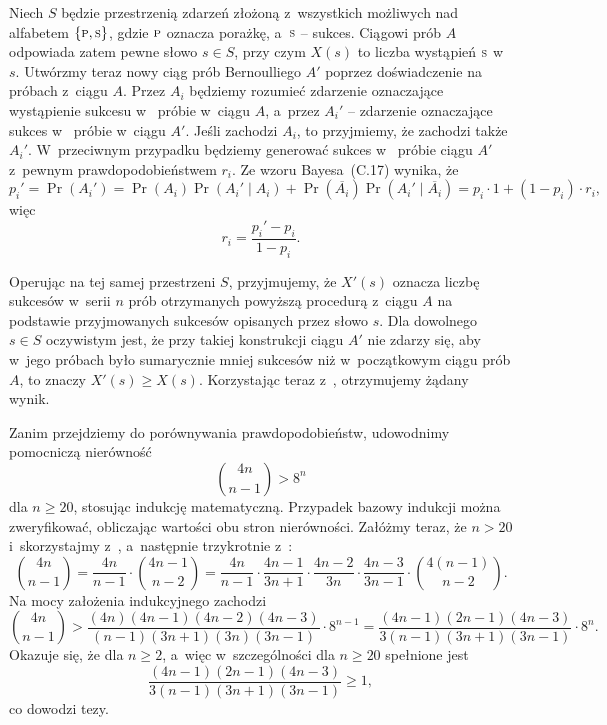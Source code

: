 \exercise %
Niech $S$ będzie przestrzenią zdarzeń złożoną z~wszystkich możliwych  nad alfabetem $\{{\scriptstyle\rm P},{\scriptstyle\rm S}\}$, gdzie ${\scriptstyle\rm P}$ oznacza porażkę, a~${\scriptstyle\rm S}$ -- sukces. Ciągowi prób $A$ odpowiada zatem pewne słowo $s\in S$, przy czym $X(s)$ to liczba wystąpień ${\scriptstyle\rm S}$ w~$s$. Utwórzmy teraz nowy ciąg prób Bernoulliego $A'$ poprzez doświadczenie na próbach z~ciągu $A$. Przez $A_i$ będziemy rozumieć zdarzenie oznaczające wystąpienie sukcesu w~ próbie w~ciągu $A$, a~przez $A_i'$ -- zdarzenie oznaczające sukces w~ próbie w~ciągu $A'$. Jeśli zachodzi $A_i$, to przyjmiemy, że zachodzi także $A_i'$. W~przeciwnym przypadku będziemy generować sukces w~ próbie ciągu $A'$ z~pewnym prawdopodobieństwem $r_i$. Ze wzoru Bayesa~(C.17) wynika, że
\[
    p_i' = \Pr(A_i') = \Pr(A_i)\Pr(A_i'\mid A_i)+\Pr(\overline{A_i})\Pr(A_i'\mid\overline{A_i}) = p_i\cdot1+(1-p_i)\cdot r_i,
\]
więc
\[
    r_i = \frac{p_i'-p_i}{1-p_i}.
\]

Operując na tej samej przestrzeni $S$, przyjmujemy, że $X'(s)$ oznacza liczbę sukcesów w~serii $n$ prób otrzymanych powyższą procedurą z~ciągu $A$ na podstawie przyjmowanych sukcesów opisanych przez słowo $s$. Dla dowolnego $s\in S$ oczywistym jest, że przy takiej konstrukcji ciągu $A'$ nie zdarzy się, aby w~jego próbach było sumarycznie mniej sukcesów niż w~początkowym ciągu prób $A$, to znaczy $X'(s)\ge X(s)$. Korzystając teraz z~, otrzymujemy żądany wynik.


\exercise %
Zanim przejdziemy do porównywania prawdopodobieństw, udowodnimy pomocniczą nierówność
\[
    \binom{4n}{n-1} > 8^n
\]
dla $n\ge20$, stosując indukcję matematyczną. Przypadek bazowy indukcji można zweryfikować, obliczając wartości obu stron nierówności. Załóżmy teraz, że $n>20$ i~skorzystajmy z~, a~następnie trzykrotnie z~:
\[
    \binom{4n}{n-1} = \frac{4n}{n-1}\cdot\binom{4n-1}{n-2} = \frac{4n}{n-1}\cdot\frac{4n-1}{3n+1}\cdot\frac{4n-2}{3n}\cdot\frac{4n-3}{3n-1}\cdot\binom{4(n-1)}{n-2}.
\]
Na mocy założenia indukcyjnego zachodzi
\[
    \binom{4n}{n-1} > \frac{(4n)(4n-1)(4n-2)(4n-3)}{(n-1)(3n+1)(3n)(3n-1)}\cdot8^{n-1} = \frac{(4n-1)(2n-1)(4n-3)}{3(n-1)(3n+1)(3n-1)}\cdot8^n.
\]
Okazuje się, że dla $n\ge2$, a~więc w~szczególności dla $n\ge20$ spełnione jest
\[
    \frac{(4n-1)(2n-1)(4n-3)}{3(n-1)(3n+1)(3n-1)} \ge 1,
\]
co dowodzi tezy.

